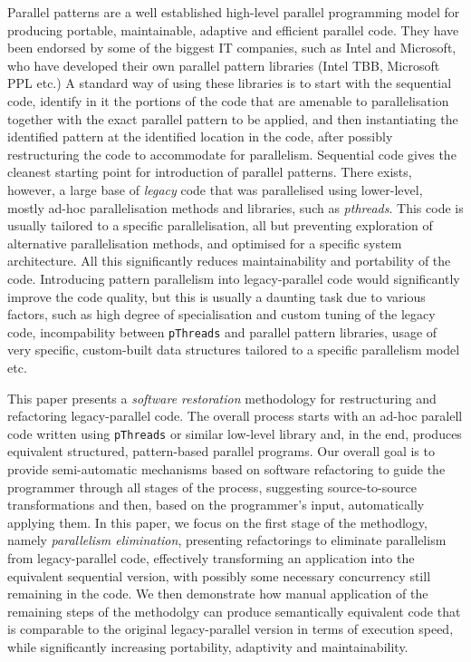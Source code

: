 Parallel patterns are a well established high-level parallel programming model for producing portable, maintainable, adaptive and efficient parallel code. They have been endorsed by some of the biggest IT companies, such as Intel and Microsoft, who have developed their own parallel pattern libraries (Intel TBB, Microsoft PPL etc.) A standard way of using these libraries is to start with the sequential code, identify in it the portions of the code that are amenable to parallelisation together with the exact parallel pattern to be applied, and then instantiating the identified pattern at the identified location in the code, after possibly restructuring the code to accommodate for parallelism. Sequential code gives the cleanest starting point for introduction of parallel patterns. There exists, however, a large base of \emph{legacy} code that was parallelised using lower-level, mostly ad-hoc parallelisation methods and libraries, such as \emph{pthreads}. This code is usually tailored to a specific parallelisation, all but preventing exploration of alternative parallelisation methods, and optimised for a specific system architecture. All this significantly reduces maintainability and portability of the code. %
Introducing pattern parallelism into legacy-parallel code would significantly improve the code quality, but this is usually a daunting task due to various factors, such as high degree of specialisation and custom tuning of the legacy code, incompability between \lstinline{pThreads} and parallel pattern libraries, usage of very specific, custom-built data structures tailored to a specific parallelism model etc.
  
This paper presents a \emph{software restoration} methodology for restructuring and refactoring legacy-parallel code. The overall process starts with an ad-hoc paralell code written using \lstinline{pThreads} or similar low-level library and, in the end, produces equivalent structured, pattern-based parallel programs. Our overall goal is to provide semi-automatic mechanisms based on software refactoring to guide the programmer through all stages of the process, suggesting source-to-source transformations and then, based on the programmer's input, automatically applying them. In this paper, we focus on the first stage of the methodlogy, namely \emph{parallelism elimination}, presenting refactorings to eliminate parallelism from legacy-parallel code, effectively transforming an application into the equivalent sequential version, with possibly some necessary concurrency still remaining in the code. We then demonstrate how manual application of the remaining steps of the methodolgy can produce semantically equivalent code that is comparable to the original legacy-parallel version in terms of execution speed, while significantly increasing portability, adaptivity and maintainability.

